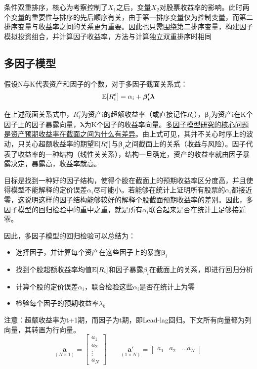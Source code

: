 \documentclass[11pt]{article}
\begin{document}
条件双重排序，核心为考察控制了$X_1$之后，变量$X_2$对股票收益率的影响。此时两个变量的重要性与排序的先后顺序有关，由于第一排序变量仅为控制变量，而第二排序变量与收益率之间的关系更为重要。因此也只需围绕第二排序变量，构建因子模拟投资组合，并计算因子收益率，方法与计算独立双重排序时相同

\subsection{多因子模型}

假设N与K代表资产和因子的个数，对于多因子截面关系式：
\begin{equation*}
    \mathbb{E}[R_{i}^{e}] = \alpha_i + \bm{\beta_{i}' \lambda}
\end{equation*}

在上述截面关系式中，$R_{i}^{e}$为资产i的超额收益率（或直接记作$R_{i}$），$\bm{\beta}_i$为资产i在K个因子上的因子暴露向量，$\bm{\lambda}$为K个因子的收益率向量。\uline{多因子模型研究的核心问题是资产预期收益率在截面之间为什么有差异}。由上式可见，其并不关心时序上的波动，只关心超额收益率的期望$\mathbb{E}[R_{i}^{e}]$与$\bm{\beta}_i$之间截面上的关系（收益与风险）。因子代表了收益率的一种结构（线性关关系），结构一旦确定，资产的收益率就由因子暴露决定，暴露高，收益率就高。

目标是找到一种好的因子结构，使得个股在截面上的预期收益率区分度高，并且使得模型不能解释的定价误差$\alpha_i$尽可能小。若能够在统计上证明所有股票的$\alpha_i$都接近零，这说明这样的因子结构能够较好的解释个股截面预期收益率的差别。因此，多因子模型的回归检验中的重中之重，就是所有$\alpha_i$联合起来是否在统计上足够接近零。

因此，多因子模型的回归检验可以总结为：
\begin{itemize}
    \item 选择因子，并计算每个资产在这些因子上的暴露$\bm{\beta}_i$
    \item 找到个股超额收益率均值$\mathbb{E}[R_{i}]$和因子暴露$\beta_i$在截面上的关系，即进行回归分析
    \item 计算个股的定价误差$\alpha_i$，联合检验这些$\alpha_i$是否在统计上为零
    \item 检验每个因子的预期收益率$\lambda_k$
\end{itemize}

注意：超额收益率为t+1期，而因子为t期，即Lead-lag回归。下文所有向量都为列向量，其转置为行向量。
\begin{equation*}
    \underset{\scriptscriptstyle{(N \times 1)}}{\bm{a}}
    = \begin{bmatrix} a_1 \\ a_2 \\ \vdots \\ a_N \end{bmatrix}
    \qquad
    \underset{\scriptscriptstyle{(1 \times N)}}{\bm{a}'}
    = \begin{bmatrix} a_1 & a_2 & \dots a_N \end{bmatrix}
\end{equation*}
\end{document}

